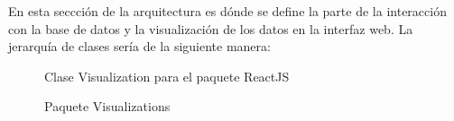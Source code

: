 En esta seccción de la arquitectura es dónde se define la parte de la interacción con la base de datos y la visualización de los datos en la interfaz web. La jerarquía de clases sería de la siguiente manera: \\

\begin{figure}[H]
  \caption{Clase Visualization para el paquete ReactJS}
\end{figure}

\begin{figure}[H]
  \caption{Paquete Visualizations}
\end{figure}

